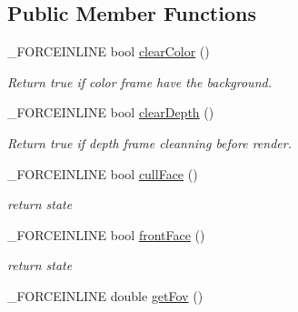 \subsection*{Public Member Functions}
\begin{DoxyCompactItemize}
\item 
\hypertarget{classcsad_1_1_camera_ad2e3a823499909d9d4970aad87f06221}{\-\_\-\-F\-O\-R\-C\-E\-I\-N\-L\-I\-N\-E bool \hyperlink{classcsad_1_1_camera_ad2e3a823499909d9d4970aad87f06221}{clear\-Color} ()}\label{classcsad_1_1_camera_ad2e3a823499909d9d4970aad87f06221}

\begin{DoxyCompactList}\small\item\em Return true if color frame have the background. \end{DoxyCompactList}\item 
\hypertarget{classcsad_1_1_camera_a8d663d371fc45973754cd34298021260}{\-\_\-\-F\-O\-R\-C\-E\-I\-N\-L\-I\-N\-E bool \hyperlink{classcsad_1_1_camera_a8d663d371fc45973754cd34298021260}{clear\-Depth} ()}\label{classcsad_1_1_camera_a8d663d371fc45973754cd34298021260}

\begin{DoxyCompactList}\small\item\em Return true if depth frame cleanning before render. \end{DoxyCompactList}\item 
\hypertarget{classcsad_1_1_camera_af2885672eda9f42ed2fd0057fc0b692a}{\-\_\-\-F\-O\-R\-C\-E\-I\-N\-L\-I\-N\-E bool \hyperlink{classcsad_1_1_camera_af2885672eda9f42ed2fd0057fc0b692a}{cull\-Face} ()}\label{classcsad_1_1_camera_af2885672eda9f42ed2fd0057fc0b692a}

\begin{DoxyCompactList}\small\item\em return state \end{DoxyCompactList}\item 
\hypertarget{classcsad_1_1_camera_a78f6b71f2fddeb774cb22c361b03fc97}{\-\_\-\-F\-O\-R\-C\-E\-I\-N\-L\-I\-N\-E bool \hyperlink{classcsad_1_1_camera_a78f6b71f2fddeb774cb22c361b03fc97}{front\-Face} ()}\label{classcsad_1_1_camera_a78f6b71f2fddeb774cb22c361b03fc97}

\begin{DoxyCompactList}\small\item\em return state \end{DoxyCompactList}\item 
\hypertarget{classcsad_1_1_camera_ace0dd65d8658ff3dc1dd37602243c71a}{\-\_\-\-F\-O\-R\-C\-E\-I\-N\-L\-I\-N\-E double \hyperlink{classcsad_1_1_camera_ace0dd65d8658ff3dc1dd37602243c71a}{get\-Fov} ()}\label{classcsad_1_1_camera_ace0dd65d8658ff3dc1dd37602243c71a}


\end{DoxyCompactItemize}
